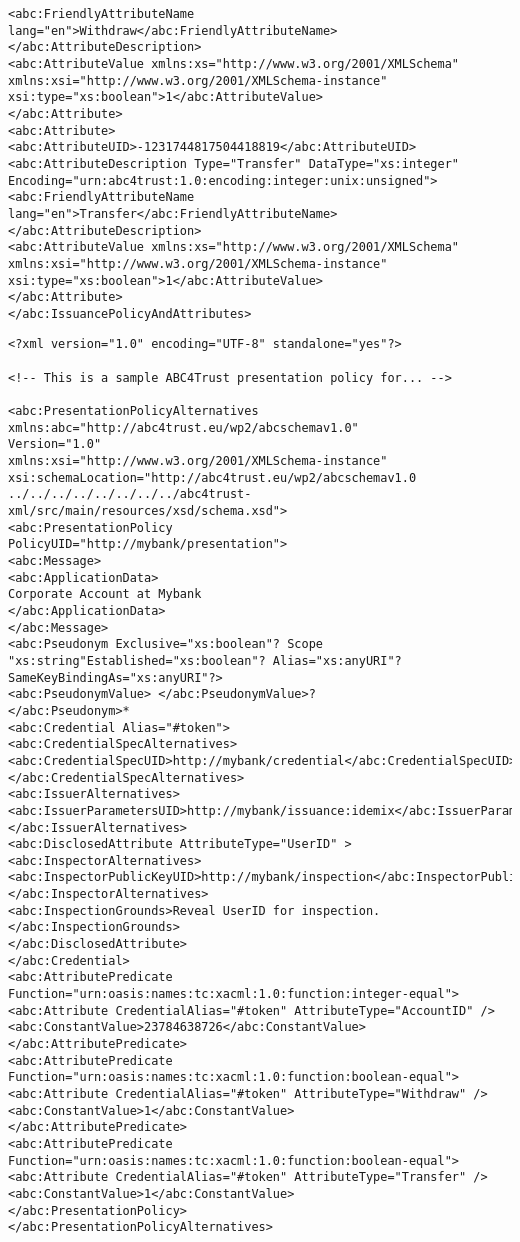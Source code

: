 \begin{lstlisting}[caption=Issuance Policy and Attributes]
<abc:FriendlyAttributeName lang="en">Withdraw</abc:FriendlyAttributeName>
</abc:AttributeDescription>
<abc:AttributeValue xmlns:xs="http://www.w3.org/2001/XMLSchema" xmlns:xsi="http://www.w3.org/2001/XMLSchema-instance" xsi:type="xs:boolean">1</abc:AttributeValue>
</abc:Attribute>
<abc:Attribute>
<abc:AttributeUID>-1231744817504418819</abc:AttributeUID>
<abc:AttributeDescription Type="Transfer" DataType="xs:integer" Encoding="urn:abc4trust:1.0:encoding:integer:unix:unsigned">
<abc:FriendlyAttributeName lang="en">Transfer</abc:FriendlyAttributeName>
</abc:AttributeDescription>
<abc:AttributeValue xmlns:xs="http://www.w3.org/2001/XMLSchema" xmlns:xsi="http://www.w3.org/2001/XMLSchema-instance" xsi:type="xs:boolean">1</abc:AttributeValue>
</abc:Attribute>
</abc:IssuancePolicyAndAttributes>
\end{lstlisting}
\begin{lstlisting}[caption=IDEMIX Presentation Policy]
<?xml version="1.0" encoding="UTF-8" standalone="yes"?>

<!-- This is a sample ABC4Trust presentation policy for... -->

<abc:PresentationPolicyAlternatives
xmlns:abc="http://abc4trust.eu/wp2/abcschemav1.0"
Version="1.0"
xmlns:xsi="http://www.w3.org/2001/XMLSchema-instance" 
xsi:schemaLocation="http://abc4trust.eu/wp2/abcschemav1.0 ../../../../../../../../abc4trust-xml/src/main/resources/xsd/schema.xsd">
<abc:PresentationPolicy
PolicyUID="http://mybank/presentation">
<abc:Message>
<abc:ApplicationData>
Corporate Account at Mybank
</abc:ApplicationData>
</abc:Message>
<abc:Pseudonym Exclusive="xs:boolean"? Scope "xs:string"Established="xs:boolean"? Alias="xs:anyURI"? SameKeyBindingAs="xs:anyURI"?>
<abc:PseudonymValue> </abc:PseudonymValue>?
</abc:Pseudonym>*
<abc:Credential Alias="#token">
<abc:CredentialSpecAlternatives>
<abc:CredentialSpecUID>http://mybank/credential</abc:CredentialSpecUID>
</abc:CredentialSpecAlternatives>
<abc:IssuerAlternatives>
<abc:IssuerParametersUID>http://mybank/issuance:idemix</abc:IssuerParametersUID>
</abc:IssuerAlternatives>
<abc:DisclosedAttribute AttributeType="UserID" >
<abc:InspectorAlternatives>
<abc:InspectorPublicKeyUID>http://mybank/inspection</abc:InspectorPublicKeyUID>
</abc:InspectorAlternatives>
<abc:InspectionGrounds>Reveal UserID for inspection.</abc:InspectionGrounds>
</abc:DisclosedAttribute>
</abc:Credential>
<abc:AttributePredicate Function="urn:oasis:names:tc:xacml:1.0:function:integer-equal">
<abc:Attribute CredentialAlias="#token" AttributeType="AccountID" />
<abc:ConstantValue>23784638726</abc:ConstantValue>
</abc:AttributePredicate>
<abc:AttributePredicate Function="urn:oasis:names:tc:xacml:1.0:function:boolean-equal">
<abc:Attribute CredentialAlias="#token" AttributeType="Withdraw" />
<abc:ConstantValue>1</abc:ConstantValue>
</abc:AttributePredicate>
<abc:AttributePredicate Function="urn:oasis:names:tc:xacml:1.0:function:boolean-equal">
<abc:Attribute CredentialAlias="#token" AttributeType="Transfer" />
<abc:ConstantValue>1</abc:ConstantValue>
</abc:PresentationPolicy>
</abc:PresentationPolicyAlternatives>
\end{lstlisting}
